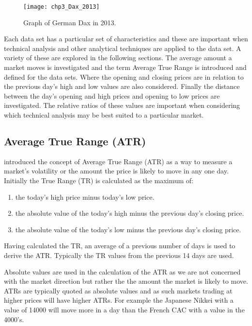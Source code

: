 \begin{figure}[tbph]
\centering
\texttt{[image: chp3\_Dax\_2013]}
\caption[Graph of Dax in 2013]{Graph of German Dax in 2013.}
\label{fig:Dax2013}
\end{figure}

Each data set has a particular set of characteristics and these are important when technical analysis and other analytical techniques are applied to the data set. A variety of these are explored in the following sections. The average amount a market moves is investigated and the term Average True Range is introduced and defined for the data sets. Where the opening and closing prices are in relation to the previous day's high and low values are also considered. Finally the distance between the day's opening and high prices and opening to low prices are investigated. The relative ratios of these values are important when considering which technical analysis may be best suited to a particular market.

\subsection{Average True Range (ATR)}
\label{chp3:atr}
\cite{wilder1978new} introduced the concept of Average True Range (ATR) as a way to measure a market's volatility or the amount the price is likely to move in any one day. Initially the True Range (TR) is calculated as the maximum of:
\begin{enumerate}
\item the today's high price minus today's low price.
\item the absolute value of the today's high minus the previous day's closing price.
\item the absolute value of the today's low minus the previous day's closing price.
\end{enumerate}
Having calculated the TR, an average of a previous number of days is used to derive the ATR. Typically the TR values from the previous 14 days are used.

Absolute values are used in the calculation of the ATR as we are not concerned with the market direction but rather the the amount the market is likely to move. ATRs are typically quoted as absolute values and as such markets trading at higher prices will have higher ATRs. For example the Japanese Nikkei with a value of 14000 will move more in a day than the French CAC with a value in the 4000's. 

